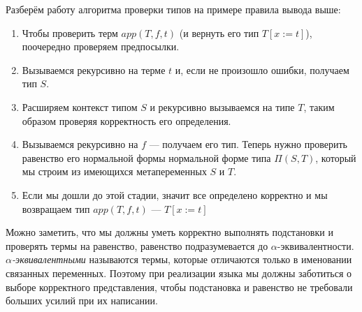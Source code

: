 Разберём работу алгоритма проверки типов на примере правила вывода выше:
\begin{enumerate}
\item Чтобы проверить терм $app(T, f, t)$ (и вернуть его тип $T[x:=t]$), поочередно проверяем предпосылки.
\item Вызываемся рекурсивно на терме $t$ и, если не произошло ошибки, получаем тип $S$.
\item Расширяем контекст типом $S$ и рекурсивно вызываемся на типе $T$, таким образом проверяя корректность его определения.
\item Вызываемся рекурсивно на $f$ --- получаем его тип. Теперь нужно проверить равенство его нормальной формы нормальной форме типа $\Pi(S, T)$, который мы строим из имеющихся метапеременных $S$ и $T$.
\item Если мы дошли до этой стадии, значит все определено корректно и мы возвращаем тип $app(T, f, t)$ --- $T[x:=t]$
\end{enumerate}

Можно заметить, что мы должны уметь корректно выполнять подстановки и проверять термы на равенство, равенство подразумевается до $\alpha$-эквивалентности. \textit{$\alpha$-эквивалентными} называются термы, которые отличаются только в именовании связанных переменных. Поэтому при реализации языка мы должны заботиться о выборе корректного представления, чтобы подстановка и равенство не требовали больших усилий при их написании.





